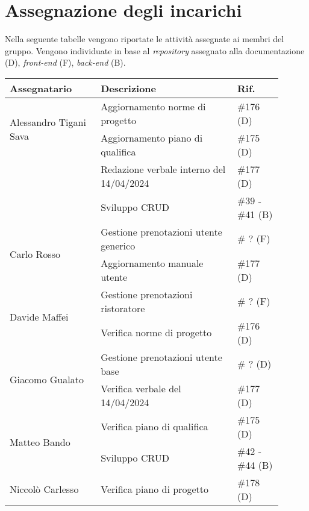 \section{Assegnazione degli incarichi}
Nella seguente tabelle vengono riportate le attività assegnate ai membri del gruppo.
Vengono individuate in base al \textit{repository} assegnato alla documentazione (D), \textit{front-end} (F), \textit{back-end} (B).

\begin{center}
	{
		\renewcommand{\arraystretch}{1.5}
		\begin{tabular}{p{0.30\linewidth}|p{0.45\linewidth}|p{0.15\linewidth}}
			\textbf{Assegnatario}          			& \textbf{Descrizione}				& \textbf{Rif.} \\
			\hline
			\multirow{2}{*}{Alessandro Tigani Sava}	& Aggiornamento norme di progetto	& \#176 (D)	\\
			\cline{2-3}
													& Aggiornamento piano di qualifica	& \#175	(D)	\\
			\cline{2-3}
													& Redazione verbale interno del 14/04/2024	& \#177	(D)	\\
			\cline{2-3}
													& Sviluppo CRUD		& \#39 - \#41 (B)	\\
			\hline
			\multirow{2}{*}{Carlo Rosso}   			& Gestione prenotazioni utente generico		& \# ? (F)	\\
			\cline{2-3}
			                               			& Aggiornamento manuale utente	& \#177	(D)	\\
			\hline
			\multirow{2}{*}{Davide Maffei} 			& Gestione prenotazioni ristoratore	& \# ? (F)	\\
			\cline{2-3}
			                               			& Verifica norme di progetto		& \#176 (D)	\\
			\hline
			\multirow{2}{*}{Giacomo Gualato}		& Gestione prenotazioni utente base	& \# ? (D)	\\
			\cline{2-3}
			                               			& Verifica verbale del 14/04/2024	& \#177	(D)	\\
			\hline
			\multirow{2}{*}{Matteo Bando}  			& Verifica piano di qualifica		& \#175	(D)	\\
			\cline{2-3}
			                               			& Sviluppo CRUD	& \#42 - \#44 (B)	\\
			\hline
			Niccolò Carlesso               			& Verifica piano di progetto		& \#178 (D)	\\
			\hline
		\end{tabular}
	}
\end{center}
